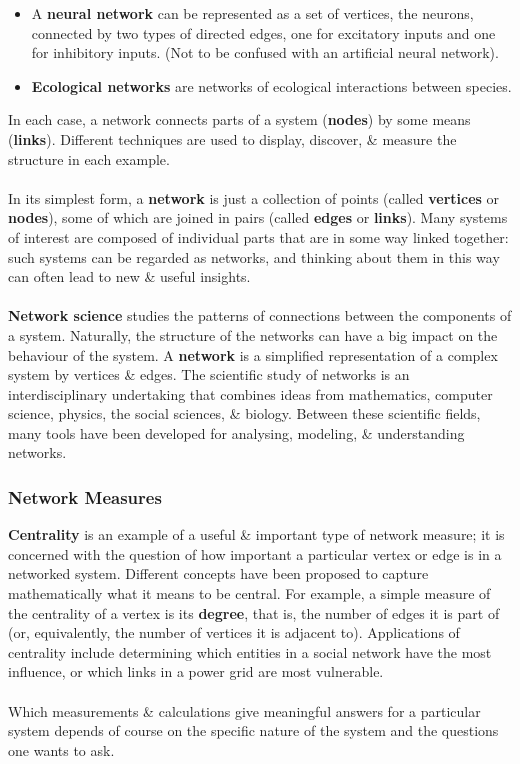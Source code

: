 \documentclass[a4paper,11pt]{article}
\begin{document}
\begin{enumerate}
\begin{itemize}
                \item   A \textbf{neural network} can be represented as a set of vertices, the neurons, connected by two types of directed edges, one for excitatory inputs and one for inhibitory inputs.
                        (Not to be confused with an artificial neural network).

                \item   \textbf{Ecological networks} are networks of ecological interactions between species.
            \end{itemize}
\end{enumerate}

In each case, a network connects parts of a system (\textbf{nodes}) by some means (\textbf{links}).
Different techniques are used to display, discover, \& measure the structure in each example.
\\\\
In its simplest form, a \textbf{network} is just a collection of points (called \textbf{vertices} or \textbf{nodes}), some of which are joined in pairs (called \textbf{edges}  or \textbf{links}).
Many systems of interest are composed of individual parts that are in some way linked together: such systems can be regarded as networks, and thinking about them in this way can often lead to new \& useful insights.
\\\\
\textbf{Network science} studies the patterns of connections between the components of a system.
Naturally, the structure of the networks can have a big impact on the behaviour of the system.
A \textbf{network} is a simplified representation of a complex system by vertices \& edges.
The scientific study of networks is an interdisciplinary undertaking that combines ideas from mathematics, computer science, physics, the social sciences, \& biology.
Between these scientific fields, many tools have been developed for analysing, modeling, \& understanding networks.

\subsubsection{Network Measures}
\textbf{Centrality} is an example of a useful \& important type of network measure; it is concerned with the question of how important a particular vertex or edge is in a networked system.
Different concepts have been proposed to capture mathematically what it means to be central.
For example, a simple measure of the centrality of a vertex is its \textbf{degree}, that is, the number of edges it is part of (or, equivalently, the number of vertices it is adjacent to).
Applications of centrality include determining which entities in a social network have the most influence, or which links in a power grid are most vulnerable.
\\\\
Which measurements \& calculations give meaningful answers for a particular system depends of course on the specific nature of the system and the questions one wants to ask. 
\end{document}
